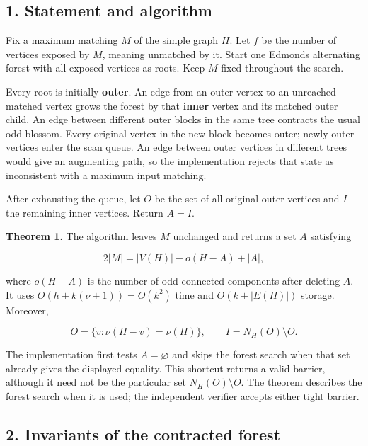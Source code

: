 \hypertarget{af-43f6530146-statement-and-algorithm}{%
\subsection{1. Statement and algorithm}\label{af-43f6530146-statement-and-algorithm}}

Fix a maximum matching \(M\) of the simple graph \(H\). Let \(f\) be the number of vertices exposed by \(M\), meaning unmatched by it. Start one Edmonds alternating forest with all exposed vertices as roots. Keep \(M\) fixed throughout the search.

Every root is initially \textbf{outer}. An edge from an outer vertex to an unreached matched vertex grows the forest by that \textbf{inner} vertex and its matched outer child. An edge between different outer blocks in the same tree contracts the usual odd blossom. Every original vertex in the new block becomes outer; newly outer vertices enter the scan queue. An edge between outer vertices in different trees would give an augmenting path, so the implementation rejects that state as inconsistent with a maximum input matching.

After exhausting the queue, let \(O\) be the set of all original outer vertices and \(I\) the remaining inner vertices. Return \(A=I\).

\textbf{Theorem 1.} The algorithm leaves \(M\) unchanged and returns a set \(A\) satisfying

\[
2|M|=|V(H)|-o(H-A)+|A|,
\]

where \(o(H-A)\) is the number of odd connected components after deleting \(A\). It uses \(O(h+k(\nu+1))=O(k^2)\) time and \(O(k+|E(H)|)\) storage. Moreover,

\[
O=\{v:\nu(H-v)=\nu(H)\},
\qquad I=N_H(O)\setminus O.
\]

The implementation first tests \(A=\varnothing\) and skips the forest search when that set already gives the displayed equality. This shortcut returns a valid barrier, although it need not be the particular set \(N_H(O)\setminus O\). The theorem describes the forest search when it is used; the independent verifier accepts either tight barrier.

\hypertarget{af-43f6530146-invariants-of-the-contracted-forest}{%
\subsection{2. Invariants of the contracted forest}\label{af-43f6530146-invariants-of-the-contracted-forest}}

